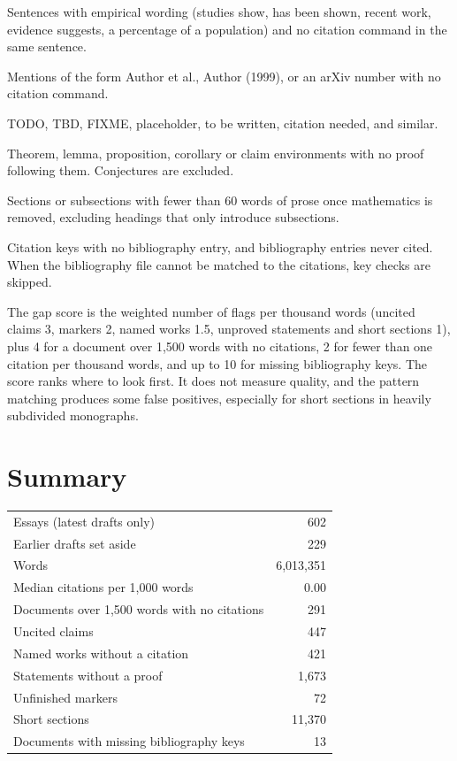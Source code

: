 \documentclass[11pt]{article}
\begin{document}
\begin{description}[leftmargin=1em,style=nextline]
\item[Uncited claims] Sentences with empirical wording (studies show, has been shown, recent work, evidence suggests, a percentage of a population) and no citation command in the same sentence.
\item[Named works] Mentions of the form Author et al., Author (1999), or an arXiv number with no citation command.
\item[Unfinished markers] TODO, TBD, FIXME, placeholder, to be written, citation needed, and similar.
\item[Unproved statements] Theorem, lemma, proposition, corollary or claim environments with no proof following them. Conjectures are excluded.
\item[Short sections] Sections or subsections with fewer than 60 words of prose once mathematics is removed, excluding headings that only introduce subsections.
\item[Bibliography mismatches] Citation keys with no bibliography entry, and bibliography entries never cited. When the bibliography file cannot be matched to the citations, key checks are skipped.
\end{description}
The gap score is the weighted number of flags per thousand words (uncited claims 3, markers 2, named works 1.5, unproved statements and short sections 1), plus 4 for a document over 1,500 words with no citations, 2 for fewer than one citation per thousand words, and up to 10 for missing bibliography keys. The score ranks where to look first. It does not measure quality, and the pattern matching produces some false positives, especially for short sections in heavily subdivided monographs.

\section{Summary}

\begin{center}\begin{tabular}{lr}\toprule
Essays (latest drafts only) & 602 \\
Earlier drafts set aside & 229 \\
Words & 6,013,351 \\
Median citations per 1,000 words & 0.00 \\
Documents over 1,500 words with no citations & 291 \\
Uncited claims & 447 \\
Named works without a citation & 421 \\
Statements without a proof & 1,673 \\
Unfinished markers & 72 \\
Short sections & 11,370 \\
Documents with missing bibliography keys & 13 \\
\bottomrule\end{tabular}\end{center}
\end{document}
